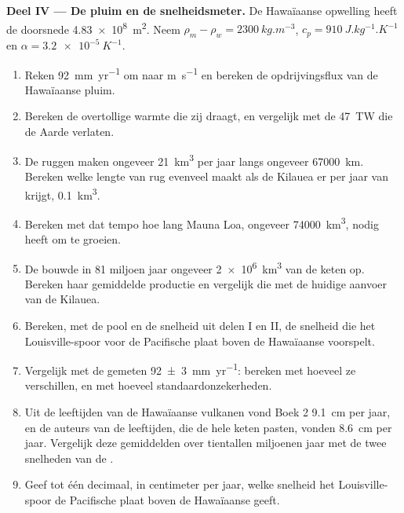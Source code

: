 \begin{problem}
\medskip
\noindent\textbf{Deel IV --- De pluim en de snelheidsmeter.} De Hawaïaanse opwelling
heeft de doorsnede \qty{4.83e8}{m^2}. Neem
$\rho_m - \rho_w = \qty{2300}{kg.m^{-3}}$, $c_p = \qty{910}{J.kg^{-1}.K^{-1}}$
en $\alpha = \qty{3.2e-5}{K^{-1}}$.
\begin{enumerate}[resume]
  \item Reken \qty{92}{mm.yr^{-1}} om naar \unit{m.s^{-1}} en bereken de
        opdrijvingsflux van de Hawaïaanse pluim.
  \item Bereken de overtollige warmte die zij draagt, en vergelijk met de
        \qty{47}{TW} die de Aarde verlaten.
  \item De ruggen maken ongeveer \qty{21}{km^3}  per jaar langs ongeveer
        \qty{67000}{km}. Bereken welke lengte van rug evenveel  maakt als de
        Kilauea er per jaar van krijgt, \qty{0.1}{km^3}.
  \item Bereken met dat tempo hoe lang Mauna Loa, ongeveer \qty{74000}{km^3},
        nodig heeft om te groeien.
  \item De  bouwde in 81 miljoen jaar ongeveer \qty{2e6}{km^3} van de keten
        op. Bereken haar gemiddelde productie en vergelijk die met de huidige aanvoer van de Kilauea.
  \item Bereken, met de pool en de snelheid uit delen I en II, de snelheid die het
        Louisville-spoor voor de Pacifische plaat boven de Hawaïaanse  voorspelt.
  \item Vergelijk met de gemeten \qty[uncertainty-mode=separate]{92 \pm 3}{mm.yr^{-1}}: bereken met hoeveel ze verschillen, en met hoeveel standaardonzekerheden.
  \item Uit de leeftijden van de Hawaïaanse vulkanen vond Boek 2 \qty{9.1}{cm} per
        jaar, en de auteurs van de leeftijden, die de hele keten pasten, vonden
        \qty{8.6}{cm} per jaar. Vergelijk deze gemiddelden over tientallen miljoenen
        jaar met de twee snelheden van de .
  \item Geef tot één decimaal, in centimeter per jaar, welke snelheid het
        Louisville-spoor de Pacifische plaat boven de Hawaïaanse  geeft.
\end{enumerate}
\end{problem}
